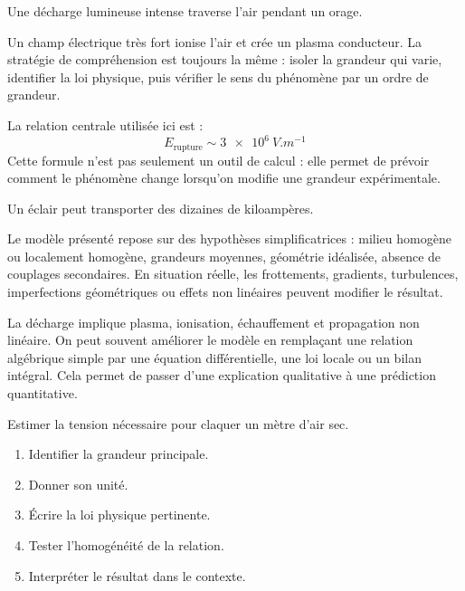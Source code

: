 \documentclass[11pt,a4paper]{article}
\begin{document}
\begin{exemplebox}
Une décharge lumineuse intense traverse l'air pendant un orage.
\end{exemplebox}

\begin{methodebox}
Un champ électrique très fort ionise l'air et crée un plasma conducteur.
La stratégie de compréhension est toujours la même : isoler la grandeur qui varie, identifier la loi physique, puis vérifier le sens du phénomène par un ordre de grandeur.
\end{methodebox}

\begin{theorembox}
La relation centrale utilisée ici est :
\[
E_{\mathrm{rupture}}\sim \SI{3e6}{V.m^{-1}}
\]
Cette formule n'est pas seulement un outil de calcul : elle permet de prévoir comment le phénomène change lorsqu'on modifie une grandeur expérimentale.
\end{theorembox}

\begin{odgbox}
Un éclair peut transporter des dizaines de kiloampères.
\end{odgbox}

\begin{attentionbox}
Le modèle présenté repose sur des hypothèses simplificatrices : milieu homogène ou localement homogène, grandeurs moyennes, géométrie idéalisée, absence de couplages secondaires. En situation réelle, les frottements, gradients, turbulences, imperfections géométriques ou effets non linéaires peuvent modifier le résultat.
\end{attentionbox}

\begin{approfondissementbox}
La décharge implique plasma, ionisation, échauffement et propagation non linéaire.
On peut souvent améliorer le modèle en remplaçant une relation algébrique simple par une équation différentielle, une loi locale ou un bilan intégral. Cela permet de passer d'une explication qualitative à une prédiction quantitative.
\end{approfondissementbox}

\begin{exercicebox}
Estimer la tension nécessaire pour claquer un mètre d'air sec.
\begin{enumerate}
  \item Identifier la grandeur principale.
  \item Donner son unité.
  \item Écrire la loi physique pertinente.
  \item Tester l'homogénéité de la relation.
  \item Interpréter le résultat dans le contexte.
\end{enumerate}
\end{exercicebox}
\end{document}
